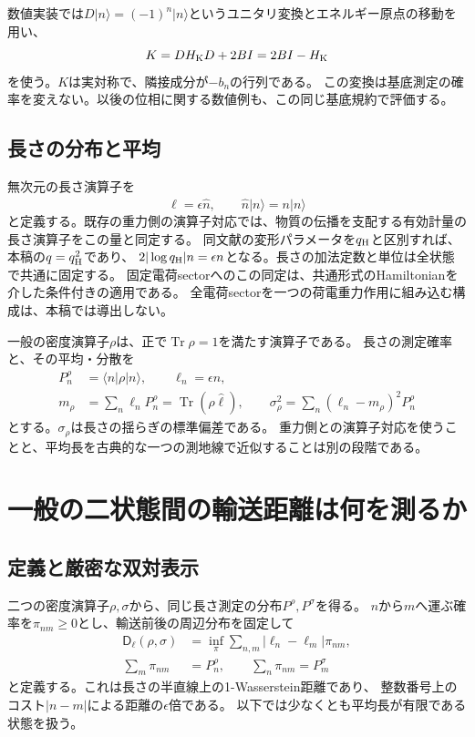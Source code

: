 \documentclass[a4paper,11pt]{ltjsarticle}
\numberwithin{equation}{section}
\newcommand{\ket}[1]{\lvert #1\rangle}
\newcommand{\bra}[1]{\langle #1\rvert}
\newcommand{\Tr}{\operatorname{Tr}}
\begin{document}
数値実装では$D\ket n=(-1)^n\ket n$というユニタリ変換とエネルギー原点の移動を用い、
\begin{equation}
 K=D H_{\rm K}D+2B I=2B I-H_{\rm K}
 \label{eq:shift}
\end{equation}
を使う。$K$は実対称で、隣接成分が$-b_n$の行列である。
この変換は基底測定の確率を変えない。以後の位相に関する数値例も、この同じ基底規約で評価する。

\subsection{長さの分布と平均}
無次元の長さ演算子を
\begin{equation}
 \hat\ell=\epsilon\hat n,\qquad \hat n\ket n=n\ket n
 \label{eq:lengthoperator}
\end{equation}
と定義する。既存の重力側の演算子対応では、物質の伝播を支配する有効計量の長さ演算子をこの量と同定する\cite{Heller}。
同文献の変形パラメータを$q_{\rm H}$と区別すれば、本稿の$q=q_{\rm H}^2$であり、
$2|\log q_{\rm H}|n=\epsilon n$となる。長さの加法定数と単位は全状態で共通に固定する。
固定電荷sectorへのこの同定は、共通形式のHamiltonianを介した条件付きの適用である。
全電荷sectorを一つの荷電重力作用に組み込む構成は、本稿では導出しない。

一般の密度演算子$\rho$は、正で$\Tr\rho=1$を満たす演算子である。
長さの測定確率と、その平均・分散を
\begin{align}
 P_n^\rho&=\bra n\rho\ket n,\qquad \ell_n=\epsilon n,
 \label{eq:probability}\\
 m_\rho&=\sum_n\ell_nP_n^\rho=\Tr(\rho\hat\ell),\qquad
 \sigma_\rho^2=\sum_n(\ell_n-m_\rho)^2P_n^\rho
 \label{eq:moments}
\end{align}
とする。$\sigma_\rho$は長さの揺らぎの標準偏差である。
重力側との演算子対応を使うことと、平均長を古典的な一つの測地線で近似することは別の段階である。

\section{一般の二状態間の輸送距離は何を測るか}
\subsection{定義と厳密な双対表示}
二つの密度演算子$\rho,\sigma$から、同じ長さ測定の分布$P^\rho,P^\sigma$を得る。
$n$から$m$へ運ぶ確率を$\pi_{nm}\geq0$とし、輸送前後の周辺分布を固定して
\begin{align}
 \mathsf D_\ell(\rho,\sigma)
 &=\inf_\pi\sum_{n,m}|\ell_n-\ell_m|\pi_{nm},
 \label{eq:distance}\\
 \sum_m\pi_{nm}&=P_n^\rho,\qquad \sum_n\pi_{nm}=P_m^\sigma
 \label{eq:coupling}
\end{align}
と定義する。これは長さの半直線上の1-Wasserstein距離であり、
整数番号上のコスト$|n-m|$による距離の$\epsilon$倍である。
以下では少なくとも平均長が有限である状態を扱う。
\end{document}
